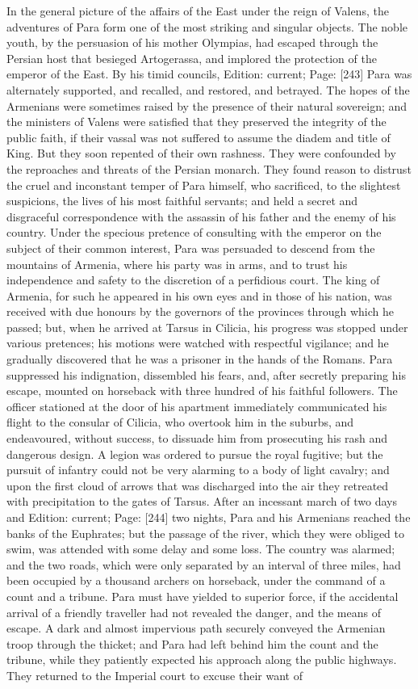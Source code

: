 In the general picture of the affairs of the East under the reign of Valens, the adventures of Para form one of the most striking and singular objects. The noble youth, by the persuasion of his mother Olympias, had escaped through the Persian host that besieged Artogerassa, and implored the protection of the emperor of the East. By his timid councils, Edition: current; Page: [243] Para was alternately supported, and recalled, and restored, and betrayed. The hopes of the Armenians were sometimes raised by the presence of their natural sovereign; and the ministers of Valens were satisfied that they preserved the integrity of the public faith, if their vassal was not suffered to assume the diadem and title of King. But they soon repented of their own rashness. They were confounded by the reproaches and threats of the Persian monarch. They found reason to distrust the cruel and inconstant temper of Para himself, who sacrificed, to the slightest suspicions, the lives of his most faithful servants; and held a secret and disgraceful correspondence with the assassin of his father and the enemy of his country. Under the specious pretence of consulting with the emperor on the subject of their common interest, Para was persuaded to descend from the mountains of Armenia, where his party was in arms, and to trust his independence and safety to the discretion of a perfidious court. The king of Armenia, for such he appeared in his own eyes and in those of his nation, was received with due honours by the governors of the provinces through which he passed; but, when he arrived at Tarsus in Cilicia, his progress was stopped under various pretences; his motions were watched with respectful vigilance; and he gradually discovered that he was a prisoner in the hands of the Romans. Para suppressed his indignation, dissembled his fears, and, after secretly preparing his escape, mounted on horseback with three hundred of his faithful followers. The officer stationed at the door of his apartment immediately communicated his flight to the consular of Cilicia, who overtook him in the suburbs, and endeavoured, without success, to dissuade him from prosecuting his rash and dangerous design. A legion was ordered to pursue the royal fugitive; but the pursuit of infantry could not be very alarming to a body of light cavalry; and upon the first cloud of arrows that was discharged into the air they retreated with precipitation to the gates of Tarsus. After an incessant march of two days and Edition: current; Page: [244] two nights, Para and his Armenians reached the banks of the Euphrates; but the passage of the river, which they were obliged to swim, was attended with some delay and some loss. The country was alarmed; and the two roads, which were only separated by an interval of three miles, had been occupied by a thousand archers on horseback, under the command of a count and a tribune. Para must have yielded to superior force, if the accidental arrival of a friendly traveller had not revealed the danger, and the means of escape. A dark and almost impervious path securely conveyed the Armenian troop through the thicket; and Para had left behind him the count and the tribune, while they patiently expected his approach along the public highways. They returned to the Imperial court to excuse their want of 